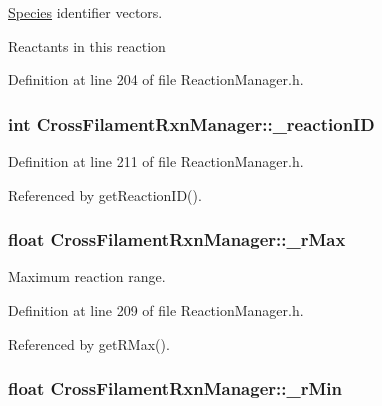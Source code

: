 \hyperlink{classSpecies}{Species} identifier vectors. 

Reactants in this reaction 

Definition at line 204 of file Reaction\+Manager.\+h.

\hypertarget{classCrossFilamentRxnManager_a97369fa2db6318dd7b60c3772087b4e1}{
\subsubsection[{\+\_\+reaction\+I\+D}]{\setlength{\rightskip}{0pt plus 5cm}int Cross\+Filament\+Rxn\+Manager\+::\+\_\+reaction\+I\+D\hspace{0.3cm}{\ttfamily [protected]}}}\label{classCrossFilamentRxnManager_a97369fa2db6318dd7b60c3772087b4e1}


Definition at line 211 of file Reaction\+Manager.\+h.



Referenced by get\+Reaction\+I\+D().

\hypertarget{classCrossFilamentRxnManager_a8027479055b5bc902c2f3eab39fc6d50}{
\subsubsection[{\+\_\+r\+Max}]{\setlength{\rightskip}{0pt plus 5cm}float Cross\+Filament\+Rxn\+Manager\+::\+\_\+r\+Max\hspace{0.3cm}{\ttfamily [protected]}}}\label{classCrossFilamentRxnManager_a8027479055b5bc902c2f3eab39fc6d50}


Maximum reaction range. 



Definition at line 209 of file Reaction\+Manager.\+h.



Referenced by get\+R\+Max().

\hypertarget{classCrossFilamentRxnManager_a0822316b3a9bea17ceecc12231ae8eee}{
\subsubsection[{\+\_\+r\+Min}]{\setlength{\rightskip}{0pt plus 5cm}float Cross\+Filament\+Rxn\+Manager\+::\+\_\+r\+Min\hspace{0.3cm}{\ttfamily [protected]}}}\label{classCrossFilamentRxnManager_a0822316b3a9bea17ceecc12231ae8eee}


